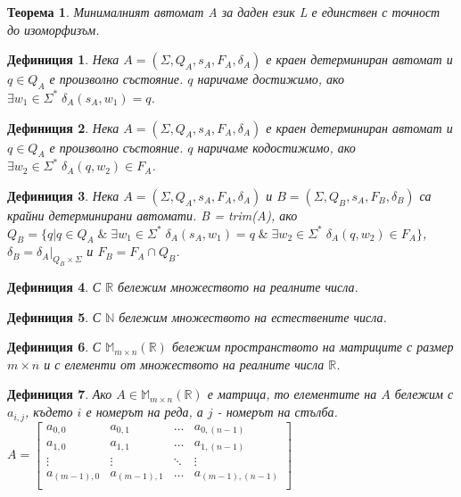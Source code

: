\documentclass[a4paper,12pt]{article}
\newtheorem{thm}{Теорема}[section]
\newtheorem{defn}{Дефиниция}[section]
\begin{document}
\begin{thm}
Минималният автомат A за даден език L е единствен с точност до изоморфизъм.
\end{thm}

\begin{defn}
Нека $A = (\Sigma, Q_A, s_A, F_A, \delta_A)$ е краен детерминиран автомат и $q \in Q_A$ е произволно състояние. $q$ наричаме достижимо, ако
$\exists w_1 \in \Sigma^* \; \delta_A(s_A, w_1) = q$.
\end{defn}

\begin{defn}
Нека $A = (\Sigma, Q_A, s_A, F_A, \delta_A)$ е краен детерминиран автомат и $q \in Q_A$ е произволно състояние. $q$ наричаме кодостижимо, ако
$\exists w_2 \in \Sigma^* \; \delta_A(q, w_2) \in F_A$.
\end{defn}

\begin{defn}
Нека $A = (\Sigma, Q_A, s_A, F_A, \delta_A)$ и $B = (\Sigma, Q_B, s_A, F_B, \delta_B)$ са крайни детерминирани
автомати. B = trim(A), ако $Q_B = \{q | q \in Q_A \;\&\; \exists w_1 \in \Sigma^* \; \delta_A(s_A, w_1) = q \;\&\; \exists w_2 \in \Sigma^* \; \delta_A(q, w_2) \in F_A\} $,
$\delta_B = \left.{\delta_A}\right|_{Q_B \times \Sigma}$ и $F_B = F_A \cap Q_B$.
\end{defn}

\begin{defn}
С $\mathbb{R}$ бележим множеството на реалните числа.
\end{defn}

\begin{defn}
С $\mathbb{N}$ бележим множеството на естествените числа.
\end{defn}

\begin{defn}
С $\mathbb{M}_{m \times n} (\mathbb{R})$ бележим пространството на матриците с размер ${m \times n}$ и с елементи от множеството на реалните числа $\mathbb{R}$.
\end{defn}

\begin{defn}
Ако $A \in \mathbb{M}_{m \times n} (\mathbb{R})$ е матрица, то елементите на $A$ бележим с $a_{i,j}$, където $i$ е номерът на реда, а $j$ - номерът на стълба. \\
$A = \begin{bmatrix}
  a_{0,0}     & a_{0,1}     & \dots  & a_{0,(n-1)} \\ 
  a_{1,0}     & a_{1,1}     & \dots  & a_{1,(n-1)} \\ 
  \vdots      & \vdots      & \ddots & \vdots \\
  a_{(m-1),0} & a_{(m-1),1} & \dots  & a_{(m-1),(n-1)} \\ 
\end{bmatrix}$
\end{defn}
\end{document}
